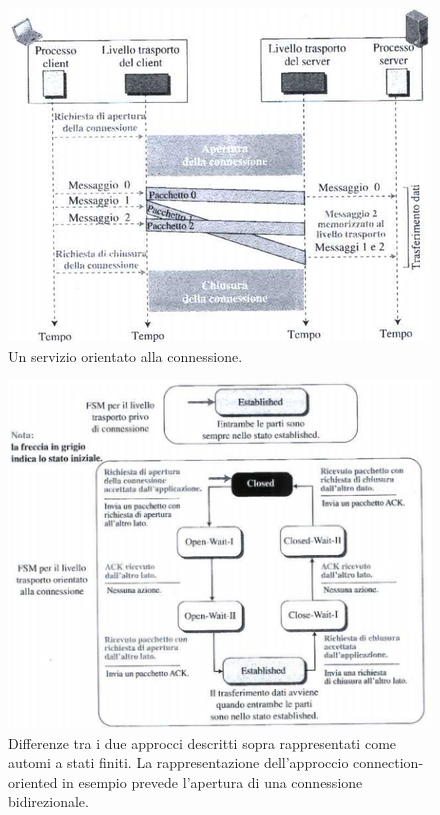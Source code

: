 \documentclass[11pt,a4paper,oneside]{book}
\theoremstyle{definition}
\begin{document}
\begin{figure}[!h]
	\includegraphics[scale=0.55]{Immagini/Connection_oriented.png}
	\centering
	\caption{Un servizio orientato alla connessione.}
\end{figure}
\begin{figure}[!h]
	\includegraphics[scale=0.8]{Immagini/Asf_diff.png}
	\centering
	\caption{Differenze tra i due approcci descritti sopra rappresentati come automi a stati finiti. La rappresentazione dell'approccio connection-oriented in esempio prevede l'apertura di una connessione bidirezionale.}
\end{figure}

\pagebreak
\end{document}
